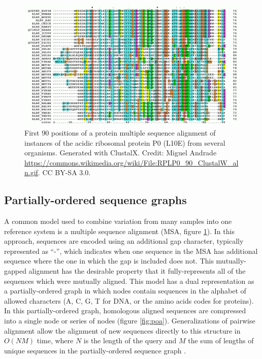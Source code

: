 \documentclass{article}
\begin{document}
\begin{figure}[t]
\centering
\includegraphics[width=1.0\textwidth]{figures/RPLP0_90_ClustalW_aln}
\caption{\label{fig:msa}
  First 90 positions of a protein multiple sequence alignment of instances of the acidic ribosomal protein P0 (L10E) from several organisms. Generated with ClustalX. Credit: Miguel Andrade \url{https://commons.wikimedia.org/wiki/File:RPLP0_90_ClustalW_aln.gif}. CC BY-SA 3.0.
}
\end{figure}

\subsection{Partially-ordered sequence graphs}

A common model used to combine variation from many samples into one reference system is a multiple sequence alignment (MSA, figure \ref{fig:msa}). In this approach, sequences are encoded using an additional gap character, typically represented as ``-'', which indicates when one sequence in the MSA has additional sequence where the one in which the gap is included does not. This mutually-gapped alignment has the desirable property that it fully-represents all of the sequences which were mutually aligned. This model has a dual representation as a partially-ordered graph in which nodes contain sequences in the alphabet of allowed characters (A, C, G, T for DNA, or the amino acids codes for proteins). In this partially-ordered graph, homologous aligned sequences are compressed into a single node or series of nodes (figure \ref{fig:poa}). Generalizations of pairwise alignment \cite{gotoh1982} allow the alignment of new sequences directly to this structure in $O(NM)$ time, where $N$ is the length of the query and $M$ the sum of lengths of unique sequences in the partially-ordered sequence graph \cite{lee2002POA}.
\end{document}
